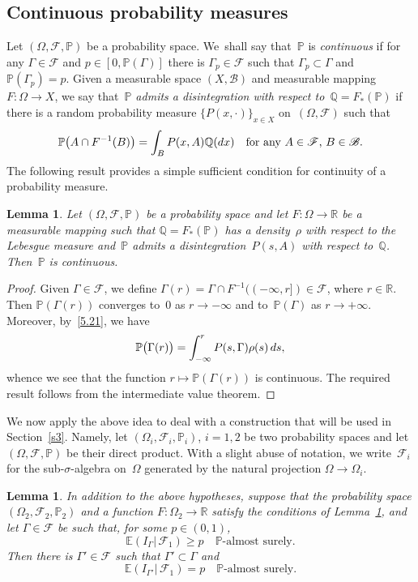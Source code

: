 \documentclass[11pt]{article}
\theoremstyle{plain}
\newtheorem{lemma}[theorem]{Lemma}
\theoremstyle{definition}
\let\mathcal\mathscr
\theoremstyle{plain}
\numberwithin{equation}{section}
\newcommand{\dd}{{\textup d}}
\newcommand{\Q}{{\mathbb Q}}
\newcommand{\R}{{\mathbb R}}
\newcommand{\IP}{{\mathbb P}}
\newcommand{\E}{{\mathbb E}}
\newcommand{\BB}{{\mathcal B}}
\newcommand{\FF}{{\mathcal F}}
\begin{document}
\subsection{Continuous probability measures}
\label{s5.2}
Let $(\Omega,\FF,\IP)$ be a probability space. We~shall say that~$\IP$ is \emph{continuous} if for any $\Gamma\in\FF$ and $p\in[0,\IP(\Gamma)]$ there is $\Gamma_p\in\FF$ such that $\Gamma_p\subset\Gamma$ and $\IP(\Gamma_p)=p$. Given a measurable space $(X,\BB)$ and measurable mapping $F:\Omega\to X$, we say that~\emph{$\IP$ admits a disintegration with respect to~$\Q=F_*(\IP)$} if there is a random probability measure $\{P(x,\cdot)\}_{x\in X}$ on~$(\Omega,\FF)$ such that
\begin{equation} \label{5.21}
\IP\bigl(A\cap F^{-1}(B)\bigr)=\int_B P(x,A)\Q(\dd x)\quad
\text{for any $A\in\FF$, $B\in\BB$}.
\end{equation}
The following result provides a simple sufficient condition for continuity of a probability measure.

\begin{lemma} \label{l5.2}
Let $(\Omega,\FF,\IP)$ be a probability space and let $F:\Omega\to\R$ be a measurable mapping such that $\Q=F_*(\IP)$ has a density~$\rho$ with respect to the Lebesgue measure and~$\IP$ admits a disintegration~$P(s,A)$ with respect to~$\Q$. Then~$\IP$ is continuous.
\end{lemma}

\begin{proof}
Given $\Gamma\in\FF$, we define $\Gamma(r)=\Gamma\cap F^{-1}((-\infty,r])\in\FF$, where $r\in\R$. Then $\IP(\Gamma(r))$ converges to~$0$ as $r\to-\infty$ and to~$\IP(\Gamma)$ as $r\to+\infty$. Moreover, by~\eqref{5.21}, we have
\[
\IP\bigl(\Gamma(r)\bigr)=\int_{-\infty}^r P(s,\Gamma)\rho(s)\,\dd s,
\]
whence we see that the function $r\mapsto \IP(\Gamma(r))$ is continuous. The required result follows from the intermediate value theorem.
\end{proof}

We now apply the above idea to deal with a construction that will be used in Section~\ref{s3}. Namely, let $(\Omega_i,\FF_i,\IP_i)$, $i=1,2$ be two probability spaces and let $(\Omega,\FF,\IP)$ be their direct product. With a slight abuse of notation, we write~$\FF_i$ for the sub-$\sigma$-algebra on~$\Omega$ generated by the natural projection $\Omega\to\Omega_i$.

\begin{lemma} \label{l5.3}
In addition to the above hypotheses, suppose that the probability space $(\Omega_2,\FF_2,\IP_2)$ and a function $F:\Omega_2\to\R$ satisfy the conditions of Lemma~\ref{l5.2}, and let $\Gamma\in\FF$ be such that, for some $p\in(0,1)$,
\begin{equation} \label{5.22}
\E(I_\Gamma|\,\FF_1)\ge p\quad\text{$\IP$-almost surely}.
\end{equation}
Then there is $\Gamma'\in\FF$ such that $\Gamma'\subset\Gamma$ and
\begin{equation} \label{5.23}
\E(I_{\Gamma'}|\,\FF_1)= p\quad\text{$\IP$-almost surely}.
\end{equation}
\end{lemma}
\end{document}
